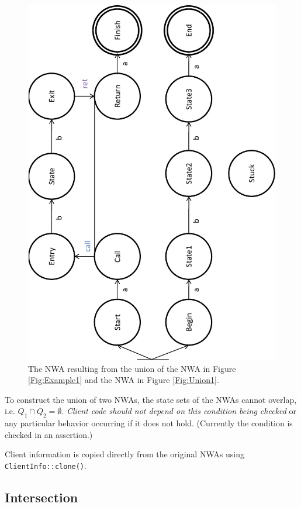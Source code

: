 \begin{figure}[htbp]
  \centering
    \includegraphics[width=12cm]{Figures/Figure4}
  \caption{The NWA resulting from the union of the NWA in Figure
    \ref{Fig:Example1} and the NWA in Figure \ref{Fig:Union1}.}
  \label{Fig:Union2}
\end{figure}

To construct the union of two
NWAs, the state sets of the NWAs cannot overlap,
i.e. $Q_1 \cap Q_2 = \emptyset$. \textsl{Client code should not depend on
  this condition being checked} or any particular behavior occurring if it
does not hold. (Currently the condition is checked in an assertion.)

Client information is copied directly from the original NWAs using
\texttt{ClientInfo::clone()}.


\subsection{Intersection}
\label{Se:Intersection}

